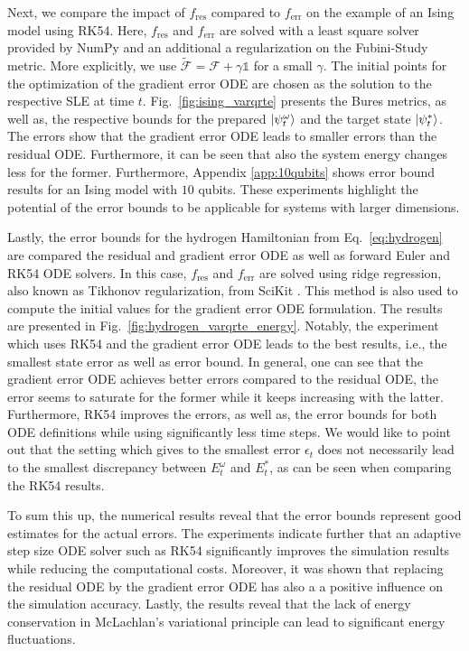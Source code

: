 \documentclass[twocolumn, aps, pra, superscriptaddress]{revtex4-1}
\begin{document}
Next, we compare the impact of $f_{\text{res}}$ compared to $f_{\text{err}}$ on the example of an Ising model using RK54.
Here, $f_{\text{res}}$ and $f_{\text{err}}$ are solved with a least square solver provided by NumPy \cite{Numpy2020} and an additional a regularization on the Fubini-Study metric. More explicitly, we use $\mathcal{\tilde F} = \mathcal{F} + \gamma\mathds{1}$ for a small $\gamma$.
The initial points for the optimization of the gradient error ODE are chosen as the solution to the respective SLE at time $t$.
Fig.~\ref{fig:ising_varqrte} presents the Bures metrics, as well as, the respective bounds for the prepared $\ket{\psi^{\omega}_t}$ and  the target state $\ket{\psi^*_t}$. The errors show that the gradient error ODE leads to smaller  errors than the residual ODE. Furthermore, it can be seen that also the system energy changes less for the former.
Furthermore, Appendix \ref{app:10qubits} shows error bound results for an Ising model with $10$ qubits. These experiments highlight the potential of the error bounds to be applicable for systems with larger dimensions.


Lastly, the error bounds for the hydrogen Hamiltonian from Eq.~\eqref{eq:hydrogen} are compared the residual and gradient error ODE as well as forward Euler and RK54 ODE solvers. 
In this case, $f_{\text{res}}$ and $f_{\text{err}}$ are solved using ridge regression, also known as Tikhonov regularization, from SciKit \cite{scikit-learn2011}. 
This method is also used to compute the initial values for the gradient error ODE formulation.
The results are presented in Fig.~\ref{fig:hydrogen_varqrte_energy}. Notably, the experiment which uses RK54 and the gradient error ODE leads to the best results, i.e., the smallest state error as well as error bound. 
In general, one can see that the gradient error ODE achieves better errors compared to the residual ODE, the error seems to saturate for the former while it keeps increasing with the latter.
Furthermore, RK54 improves the errors, as well as, the error bounds for both ODE definitions while using significantly less time steps.
We would like to point out that the setting which gives to the smallest error $\epsilon_t$ does not necessarily lead to the smallest discrepancy between $E_t^{\omega}$ and $E_t^*$, as can be seen when comparing the RK54 results.

To sum this up, the numerical results reveal that the error bounds represent good estimates for the actual errors. The experiments indicate further that an adaptive step size ODE solver such as RK54 significantly improves the simulation results while reducing the computational costs. Moreover, it was shown that replacing the residual ODE by the gradient error ODE has also a a positive influence on the simulation accuracy. 
Lastly, the results reveal that the lack of energy conservation in McLachlan's variational principle can lead to significant energy fluctuations.
\end{document}
